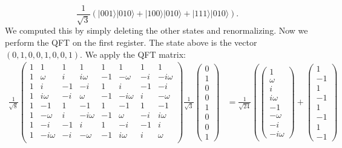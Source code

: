 \documentclass{article}
\theoremstyle{plain}
\theoremstyle{definition}
\theoremstyle{remark}
\numberwithin{theorem}{section}
\begin{document}
  \[
 \frac{1}{\sqrt{3}}\left(
 |001\rangle |010\rangle +
 |100\rangle |010\rangle +
 |111\rangle |010\rangle \right).
 \]
 We computed this by simply deleting the other states and renormalizing.
 Now we perform the QFT on the first register.  The state above is the vector $(0,1,0,0,1,0,0,1)$.  We apply the QFT matrix:
 	\begin{align*}
					\frac{1}{\sqrt{8}}
					\begin{pmatrix}
						1 & 1 & 1 & 1 & 1 & 1 & 1 & 1 \\
						1 & \omega & i & i\omega & -1 & -\omega & -i & -i\omega \\
						1 & i & -1 & -i & 1 & i & -1 & -i \\
						1 & i\omega & -i & \omega & -1 & -i\omega & i & -\omega \\
						1 & -1 & 1 & -1 & 1 & -1 & 1 & -1 \\
						1 & -\omega & i & -i\omega & -1 & \omega & -i & i\omega \\
						1 & -i & -1 & i & 1 & -i & -1 & i \\
						1 & -i\omega & -i & -\omega & -1 & i\omega & i & \omega \\
					\end{pmatrix}
     \frac{1}{\sqrt{3}}
     \begin{pmatrix} 0 \\ 1 \\ 0 \\ 0 \\ 1 \\ 0 \\ 0 \\ 1
     \end{pmatrix}
     &=
     \frac{1}{\sqrt{24}} \left(
     \begin{pmatrix} 1 \\ \omega \\ i \\ i\omega \\ -1 \\ -\omega \\ -i \\ -i\omega
     \end{pmatrix}
+
     \begin{pmatrix} 1 \\ -1 \\ 1 \\ -1 \\ 1 \\ -1 \\ 1 \\ -1

\end{pmatrix}
\end{align*}
\end{document}
